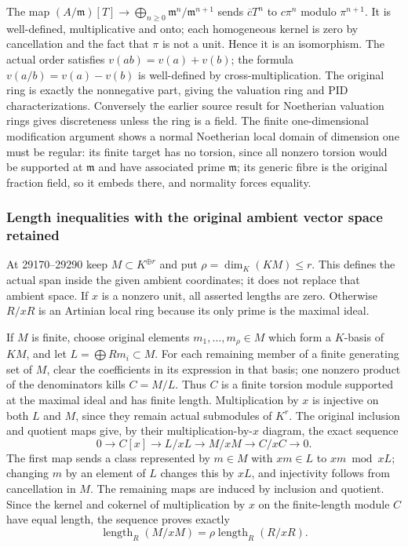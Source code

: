 The map \((A/\mathfrak m)[T]\to\bigoplus_{n\ge0}\mathfrak m^n/\mathfrak m^{n+1}\) sends \(\overline cT^n\) to \(c\pi^n\) modulo \(\pi^{n+1}\). It is well-defined, multiplicative and onto; each homogeneous kernel is zero by cancellation and the fact that \(\pi\) is not a unit. Hence it is an isomorphism. The actual order satisfies \(v(ab)=v(a)+v(b)\); the formula \(v(a/b)=v(a)-v(b)\) is well-defined by cross-multiplication. The original ring is exactly the nonnegative part, giving the valuation ring and PID characterizations. Conversely the earlier source result for Noetherian valuation rings gives discreteness unless the ring is a field. The finite one-dimensional modification argument shows a normal Noetherian local domain of dimension one must be regular: its finite target has no torsion, since all nonzero torsion would be supported at \(\mathfrak m\) and have associated prime \(\mathfrak m\); its generic fibre is the original fraction field, so it embeds there, and normality forces equality.

\subsubsection{Length inequalities with the original ambient vector space retained}\label{algebra-proof-028-length-inequalities-with-the-original-ambient-vector-space-retained}

At 29170--29290 keep \(M\subset K^{\oplus r}\) and put \(\rho=\dim_K(KM)\le r\). This defines the actual span inside the given ambient coordinates; it does not replace that ambient space. If \(x\) is a nonzero unit, all asserted lengths are zero. Otherwise \(R/xR\) is an Artinian local ring because its only prime is the maximal ideal.

If \(M\) is finite, choose original elements \(m_1,\ldots,m_\rho\in M\) which form a \(K\)-basis of \(KM\), and let \(L=\bigoplus Rm_i\subset M\). For each remaining member of a finite generating set of \(M\), clear the coefficients in its expression in that basis; one nonzero product of the denominators kills \(C=M/L\). Thus \(C\) is a finite torsion module supported at the maximal ideal and has finite length. Multiplication by \(x\) is injective on both \(L\) and \(M\), since they remain actual submodules of \(K^r\). The original inclusion and quotient maps give, by their multiplication-by-\(x\) diagram, the exact sequence \[
 0\to C[x]\to L/xL\to M/xM\to C/xC\to0.
\] The first map sends a class represented by \(m\in M\) with \(xm\in L\) to \(xm\bmod xL\); changing \(m\) by an element of \(L\) changes this by \(xL\), and injectivity follows from cancellation in \(M\). The remaining maps are induced by inclusion and quotient. Since the kernel and cokernel of multiplication by \(x\) on the finite-length module \(C\) have equal length, the sequence proves exactly \[
 \operatorname{length}_R(M/xM)=\rho\operatorname{length}_R(R/xR).
\]

